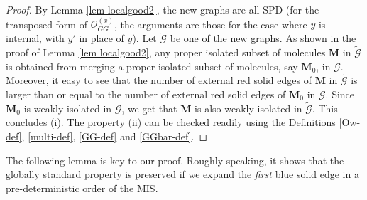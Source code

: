 \documentclass{article}
\newcommand{\1}{\mathds{1}}
\numberwithin{equation}{section}
\renewcommand{\cal}{\mathcal}
\newcommand{\wt}{\widetilde}
\theoremstyle{plain} %
\theoremstyle{remark}
\newcommand{\Pol}{{\mathbf{M}}}
\begin{document}
\begin{proof}
By Lemma \ref{lem localgood2}, the new graphs are all SPD (for the transposed form of $\cal O_{GG}^{(x)}$, the arguments are those for the case where $y$ is internal, with $y'$ in place of $y$). Let $\wt{\cal G}$ be one of the new graphs. As shown in the proof of Lemma \ref{lem localgood2}, any proper isolated subset of molecules $\Pol$ in $\wt{\cal G}$ is obtained from merging a proper isolated subset of molecules, say $\Pol_0$, in $\cal G$. Moreover, it easy to see that the number of external red solid edges of $\Pol$ in $\wt{\cal G}$ is larger than or equal to the number of external red solid edges of $\Pol_0$ in ${\cal G}$. Since $\Pol_0$ is weakly isolated in ${\cal G}$, we get that $\Pol$ is also weakly isolated in $\wt{\cal G}$. This concludes (i). 
The property (ii) can be checked readily using the Definitions \ref{Ow-def}, \ref{multi-def}, \ref{GG-def} and \ref{GGbar-def}.
%
\end{proof}

 
The following lemma is key to our proof. Roughly speaking, it shows that the globally standard property is preserved if we expand the \emph{first} blue solid edge in a pre-deterministic order of the MIS. 
\end{document}
